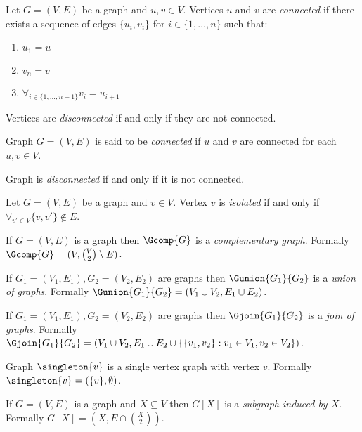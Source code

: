 \begin{defi}
    Let $G = (V,E)$ be a graph and $u, v \in V$. Vertices $u$ and $v$ are \emph{connected} if there exists a sequence of edges $\{u_i,v_i\}$ for $i \in \{1, \ldots, n\}$ such that:
    \begin{enumerate}
        \item $u_1 = u$
        \item $v_n = v$
        \item $\forall_{i \in \{1, \ldots, n - 1\}} v_i = u_{i+1}$
    \end{enumerate}

    Vertices are \emph{disconnected} if and only if they are not connected.
\end{defi}

\begin{defi}
    Graph $G = (V,E)$ is said to be \emph{connected} if $u$ and $v$ are connected for each $u,v \in V$.

    Graph is \emph{disconnected} if and only if it is not connected.
\end{defi}

\begin{defi}
    Let $G = (V,E)$ be a graph and $v \in V$. Vertex $v$ is \emph{isolated} if and only if $\forall_{v' \in V} \{v,v'\} \not\in E$.
\end{defi}

\begin{defi}
    If $G = (V, E)$ is a graph then $\Gcomp{G}$ is a \emph{complementary graph}. Formally $\Gcomp{G} = (V, \binom{V}{2} \setminus E)$.
\end{defi}
\begin{defi}
    If $G_1 = (V_1, E_1), G_2 = (V_2, E_2)$ are graphs then $\Gunion{G_1}{G_2}$ is a \emph{union of graphs}. Formally $\Gunion{G_1}{G_2} = (V_1 \cup V_2, E_1 \cup E_2)$.
\end{defi}
\begin{defi}
    If $G_1 = (V_1, E_1), G_2 = (V_2, E_2)$ are graphs then $\Gjoin{G_1}{G_2}$ is a \emph{join of graphs}. Formally $\Gjoin{G_1}{G_2} = (V_1 \cup V_2, E_1 \cup E_2 \cup \{\{v_1,v_2\} : v_1 \in V_1, v_2 \in V_2\})$.
\end{defi}

\begin{defi}
    Graph $\singleton{v}$ is a single vertex graph with vertex $v$. Formally $\singleton{v} = (\{v\}, \emptyset)$.
\end{defi}

\begin{defi}
    If $G = (V,E)$ is a graph and $X \subseteq V$ then $G[X]$ is a \emph{subgraph induced by $X$}. Formally $G[X] = (X, E \cap \binom{X}{2})$.
\end{defi}

